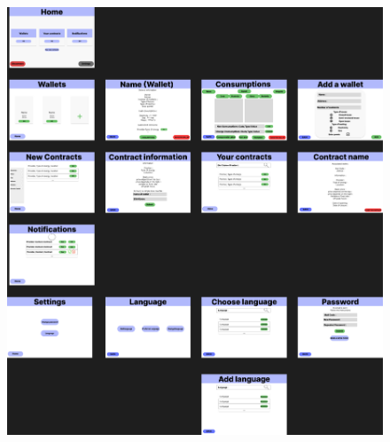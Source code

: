 \begin{figure}[h]
\centering
\includegraphics[width=1.3\textwidth]{extension-adrien/Interface/img/interface.png}
\end{figure}
